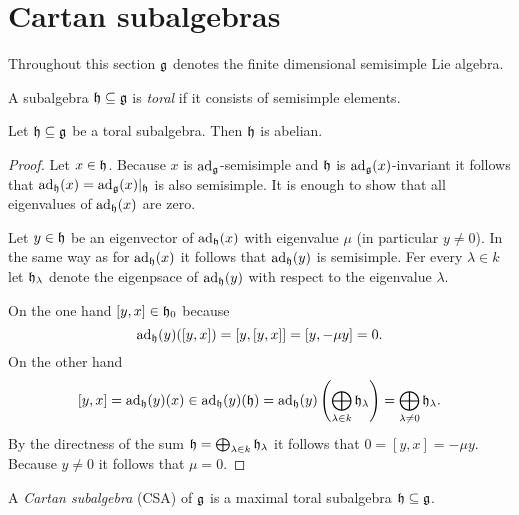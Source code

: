 \section{Cartan subalgebras}
Throughout this section $\mathfrak{g}$ denotes the finite dimensional semisimple Lie algebra.


\begin{defi}
 A subalgebra $\mathfrak{h} \subseteq \mathfrak{g}$ is \emph{toral} if it consists of semisimple elements.
\end{defi}


\begin{lem}
 Let $\mathfrak{h} \subseteq \mathfrak{g}$ be a toral subalgebra. Then $\mathfrak{h}$ is abelian.
\end{lem}
\begin{proof}
 Let $x \in \mathfrak{h}$. Because $x$ is $\operatorname{ad}_{\mathfrak{g}}$-semisimple and $\mathfrak{h}$ is $\operatorname{ad}_{\mathfrak{g}}(x)$-invariant it follows that $\operatorname{ad}_{\mathfrak{h}}(x) = \operatorname{ad}_{\mathfrak{g}}(x)|_{\mathfrak{h}}$ is also semisimple. It is enough to show that all eigenvalues of $\operatorname{ad}_{\mathfrak{h}}(x)$ are zero.
 
 Let $y \in \mathfrak{h}$ be an eigenvector of $\operatorname{ad}_{\mathfrak{h}}(x)$ with eigenvalue $\mu$ (in particular $y \neq 0$). In the same way as for $\operatorname{ad}_{\mathfrak{h}}(x)$ it follows that $\operatorname{ad}_{\mathfrak{h}}(y)$ is semisimple. Fer every $\lambda \in k$ let $\mathfrak{h}_\lambda$ denote the eigenpsace of $\operatorname{ad}_{\mathfrak{h}}(y)$ with respect to the eigenvalue $\lambda$.
 
  On the one hand $[y,x] \in \mathfrak{h}_0$ because
 \[
  \operatorname{ad}_{\mathfrak{h}}(y)([y,x])
  = [y,[y,x]]
  = [y, -\mu y]
  = 0.
 \]
 On the other hand
 \[
  [y,x]
  = \operatorname{ad}_{\mathfrak{h}}(y)(x)
  \in \operatorname{ad}_{\mathfrak{h}}(y)(\mathfrak{h})
  = \operatorname{ad}_{\mathfrak{h}}(y)\left( \bigoplus_{\lambda \in k} \mathfrak{h}_\lambda \right)
  = \bigoplus_{\lambda \neq 0} \mathfrak{h}_\lambda.
 \]
 By the directness of the sum $\mathfrak{h} = \bigoplus_{\lambda \in k} \mathfrak{h}_\lambda$ it follows that $0 = [y,x] = -\mu y$. Because $y \neq 0$ it follows that $\mu = 0$.
\end{proof}


\begin{defi}
 A \emph{Cartan subalgebra} (CSA) of $\mathfrak{g}$ is a maximal toral subalgebra $\mathfrak{h} \subseteq \mathfrak{g}$.
\end{defi}



